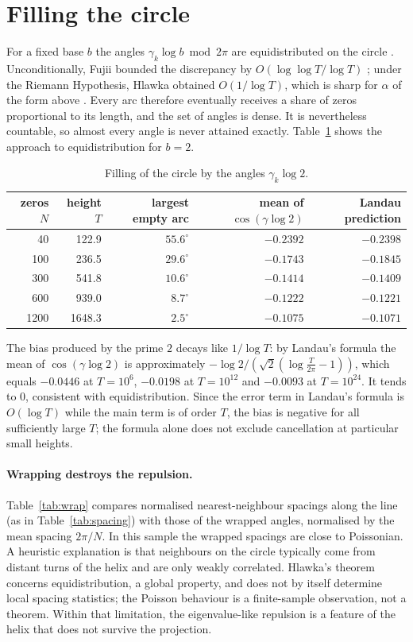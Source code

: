 \documentclass[11pt,a4paper]{article}
\theoremstyle{definition}\newtheorem{definition}[proposition]{Definition}
\theoremstyle{remark}\newtheorem{remark}[proposition]{Remark}
\begin{document}
\section{Filling the circle}\label{sec:filling}
For a fixed base $b$ the angles $\gamma_k\log b\bmod2\pi$ are equidistributed on the circle \cite{Hlawka1975}. Unconditionally, Fujii bounded the discrepancy by $O(\log\log T/\log T)$ \cite{Fujii1976}; under the Riemann Hypothesis, Hlawka obtained $O(1/\log T)$, which is sharp for $\alpha$ of the form above \cite{FordSoundararajanZaharescu}. Every arc therefore eventually receives a share of zeros proportional to its length, and the set of angles is dense. It is nevertheless countable, so almost every angle is never attained exactly. Table~\ref{tab:filling} shows the approach to equidistribution for $b=2$.

\begin{table}[ht]
\centering\small
\begin{tabular}{rrrrr}
\toprule
zeros $N$ & height $T$ & largest empty arc & mean of $\cos(\gamma\log2)$ & Landau prediction\\
\midrule
40 & 122.9 & $55.6^\circ$ & $-0.2392$ & $-0.2398$\\
100 & 236.5 & $29.6^\circ$ & $-0.1743$ & $-0.1845$\\
300 & 541.8 & $10.6^\circ$ & $-0.1414$ & $-0.1409$\\
600 & 939.0 & $8.7^\circ$ & $-0.1222$ & $-0.1221$\\
1200 & 1648.3 & $2.5^\circ$ & $-0.1075$ & $-0.1071$\\
\bottomrule
\end{tabular}
\caption{Filling of the circle by the angles $\gamma_k\log2$.}\label{tab:filling}
\end{table}

The bias produced by the prime $2$ decays like $1/\log T$: by Landau's formula the mean of $\cos(\gamma\log2)$ is approximately $-\log2/(\sqrt2(\log\frac T{2\pi}-1))$, which equals $-0.0446$ at $T=10^6$, $-0.0198$ at $T=10^{12}$ and $-0.0093$ at $T=10^{24}$. It tends to $0$, consistent with equidistribution. Since the error term in Landau's formula is $O(\log T)$ while the main term is of order $T$, the bias is negative for all sufficiently large $T$; the formula alone does not exclude cancellation at particular small heights.

\paragraph{Wrapping destroys the repulsion.} Table~\ref{tab:wrap} compares normalised nearest-neighbour spacings along the line (as in Table~\ref{tab:spacing}) with those of the wrapped angles, normalised by the mean spacing $2\pi/N$. In this sample the wrapped spacings are close to Poissonian. A heuristic explanation is that neighbours on the circle typically come from distant turns of the helix and are only weakly correlated. Hlawka's theorem concerns equidistribution, a global property, and does not by itself determine local spacing statistics; the Poisson behaviour is a finite-sample observation, not a theorem. Within that limitation, the eigenvalue-like repulsion is a feature of the helix that does not survive the projection.
\end{document}
